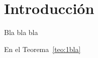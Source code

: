 \chapter{Introducción}

\begin{teorema}\label{teo:1bla}
    Bla bla bla
\end{teorema}

En el Teorema~\ref{teo:1bla}


